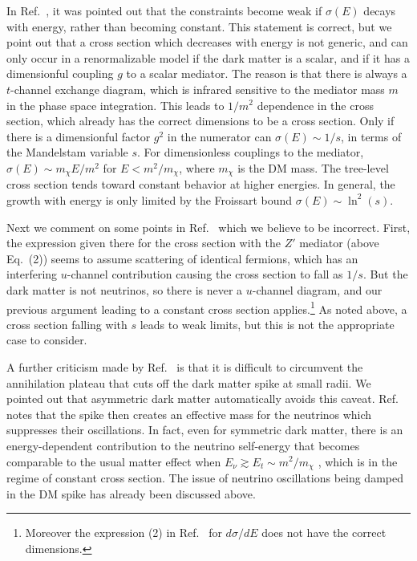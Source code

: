 \documentclass[twocolumn,prd,nofootinbib,aps,prl,floats,floatfix,amsmath,amssymb,longbibliography,secnumarabic]{revtex4-1} %
\begin{document}
In Ref.\ \cite{Farzan:2026wek}, it was pointed out that the constraints become weak if $\sigma(E)$ decays with energy, rather than becoming constant.  This statement is correct, but we point out that a cross section which decreases with energy is not generic, and can only occur in a renormalizable model if the dark matter 
is a scalar, and if it has a dimensionful coupling $g$ to a scalar mediator.  The reason is that there is always a $t$-channel exchange diagram, which is infrared sensitive to the mediator mass $m$ in the phase space integration.   
This leads to $1/m^2$ dependence in the cross section, which already has the correct dimensions to be a cross section.
Only if there is a dimensionful factor $g^2$ in the numerator can $\sigma(E)\sim 1/s$, in terms of the Mandelstam variable $s$.  For dimensionless couplings to the mediator, $\sigma(E)\sim m_\chi E/m^2$ for $E < m^2/m_\chi$, where $m_\chi$ is the DM mass.  The tree-level cross section tends toward  constant behavior  at higher energies.  In general, 
the growth with energy is only limited by the Froissart bound $\sigma(E)\sim \ln^2(s)$.

Next we comment on some points in Ref.\ \cite{Farzan:2026wek} which we believe to be incorrect.  First, the expression given there for the cross section with the $Z'$ mediator (above Eq.\ (2)) seems to assume scattering of identical fermions, which has an interfering $u$-channel contribution causing the cross section to fall as $1/s$.  But the dark matter is not neutrinos, so there is never a $u$-channel diagram, and our previous argument leading to a constant 
cross section applies.\footnote{Moreover the expression (2) in Ref.\ \cite{Farzan:2026wek} for $d\sigma/dE$ does not have the correct dimensions.}  As noted above, a cross section falling with $s$ leads to weak limits, but this is not the appropriate case to consider.

A further criticism made by Ref.\ \cite{Farzan:2026wek} is that it is difficult to circumvent the annihilation plateau that cuts off the dark matter spike at small radii.  We pointed out that asymmetric dark matter automatically avoids this caveat.  Ref.\ \cite{Farzan:2026wek} notes that the spike then creates an effective mass for the neutrinos which suppresses their oscillations.  In fact, even for symmetric dark matter, there is an energy-dependent contribution to the neutrino self-energy
that becomes comparable to the usual matter effect when $E_\nu\gtrsim E_t \sim m^2/m_\chi$ \cite{Notzold:1987ik}, which is in the regime of constant cross section.  
The issue of neutrino oscillations being damped in the DM spike has already been discussed above.  




\end{document}
